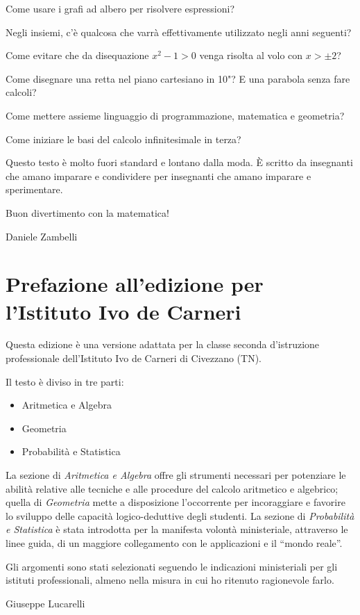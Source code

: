Come usare i grafi ad albero per risolvere espressioni?

Negli insiemi, c'è qualcosa che varrà effettivamente utilizzato negli anni
seguenti?

Come evitare che da disequazione \(x^2-1>0\) venga risolta al volo con
\(x>\pm 2\)?

Come disegnare una retta nel piano cartesiano in 10"? E una parabola senza
fare calcoli?

Come mettere assieme linguaggio di programmazione, matematica e geometria?

Come iniziare le basi del calcolo infinitesimale in terza?

Questo testo è molto fuori standard e lontano dalla moda. È scritto da
insegnanti che amano imparare e condividere per insegnanti che amano
imparare e sperimentare.

Buon divertimento con la matematica!

\begin{flushright}
Daniele Zambelli
\end{flushright}

\section{Prefazione all'edizione per l'Istituto Ivo de Carneri}

Questa edizione è una versione adattata per la classe seconda d'istruzione professionale dell'Istituto Ivo de Carneri di Civezzano (TN).

Il testo è diviso in tre parti:
\begin{itemize}
  \item Aritmetica e Algebra
  \item Geometria
  \item Probabilità e Statistica
\end{itemize}
La sezione di \emph{Aritmetica e Algebra} offre gli strumenti necessari per potenziare le abilità relative alle tecniche e alle procedure del calcolo aritmetico e algebrico; quella di \emph{Geometria} mette a disposizione l'occorrente per incoraggiare e favorire lo sviluppo delle capacità logico-deduttive degli studenti. La sezione di \emph{Probabilità e Statistica} è stata introdotta per la manifesta volontà ministeriale, attraverso le linee guida, di un maggiore collegamento con le applicazioni e il ``mondo reale''.

Gli argomenti sono stati selezionati seguendo le indicazioni ministeriali per gli istituti professionali, almeno nella misura in cui ho ritenuto ragionevole farlo.

\begin{flushright}
Giuseppe Lucarelli
\end{flushright}

